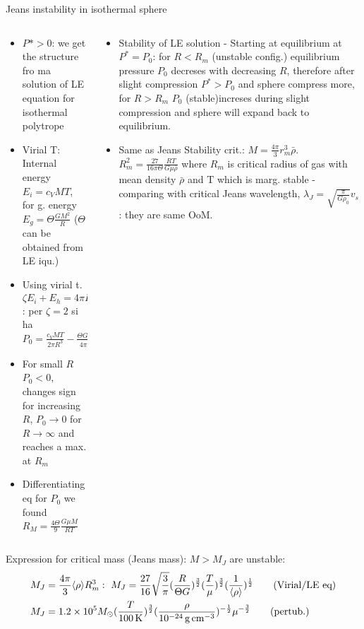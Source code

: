 \begin{frame}{Jeans instability in isothermal sphere}
    \begin{columns}[T]
        \begin{column}{0.5\textwidth}
            \begin{itemize}
                \item $P*>0$: we get the structure fro ma solution of LE equation for isothermal polytrope
                \item Virial T: Internal energy $E_i=c_VMT$, for g. energy $E_g=\Theta \frac{GM^2}{R}$ ($\Theta$ can be obtained from LE iqu.)
                \item Using virial t. $\zeta E_i+E_h=4\pi R^3P_0$: per $\zeta=2$ si ha $P_0=\frac{c_VMT}{2\pi R^3}-\frac{\Theta GM^2}{4\pi R^4}$
                \item For small $R$ $P_0<0$, changes sign for increasing $R$, $P_0\to0$ for $R\to\infty$ and reaches a max. at $R_m$
                \item Differentiating eq for $P_0$ we found $R_M=\frac{4\Theta}{9}\frac{G\mu M}{RT}$
            \end{itemize}
        \end{column}
        \begin{column}{0.5\textwidth}
            \begin{itemize}
                \item Stability of LE solution - Starting at equilibrium at $P^*=P_0$: for $R<R_m$ (unstable config.) equilibrium pressure $P_0$ decreses with decreasing $R$, therefore after slight compression $P^*>P_0$ and sphere compress more, for $R>R_m$ $P_0$ (stable)increses during slight compression and sphere will expand back to equilibrium.
                \item Same as Jeans Stability crit.: $M=\frac{4\pi}{3}r_m^3\bar{\rho}$. $R_m^2=\frac{27}{16\pi\Theta}\frac{RT}{G\mu\bar{\rho}}$ where $R_m$ is critical radius of gas with mean density $\bar{\rho}$ and T which is marg. stable - comparing with critical Jeans wavelength, $\lambda_J=\sqrt{\frac{\pi}{G\rho_0}}v_s$: they are same OoM.
            \end{itemize}
        \end{column}
    \end{columns}
    Expression for critical mass (Jeans mass): $M>M_J$ are unstable:
	\begin{align*}
        &M_J=\frac{4\pi}{3}\exv{\rho}R_m^3:\ M_J=\frac{27}{16}\sqrt{\frac{3}{\pi}}(\frac{R}{\Theta G})^{\frac{3}{2}}(\frac{T}{\mu})^{\frac{3}{2}}(\frac{1}{\exv{\rho}})^{\frac{1}{2}}\tag{Virial/LE eq}\\
&M_J=\num{1.2e5}\msun{}(\frac{T}{\SI{100}{\kelvin}})^{\frac{3}{2}}(\frac{\rho}{\SI{e-24}{\gram\per\cubic\cm}})^{-\frac{1}{2}}\mu^{-\frac{3}{2}}\tag{pertub.}
	\end{align*}
\end{frame}

